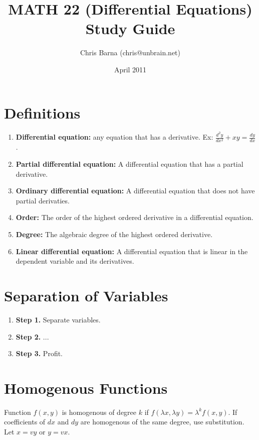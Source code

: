 \documentclass{article}
\begin{document}
\title{MATH 22 (Differential Equations) Study Guide}
\author{Chris Barna (chris@unbrain.net)}
\date{April 2011}

\maketitle

\section{Definitions}
\begin{enumerate}
  \item \textbf{Differential equation:} any equation that has a derivative. Ex: $\frac{d^2 y}{dx^2} + xy = \frac{dy}{dx}$.
  \item \textbf{Partial differential equation:} A differential equation that has a partial derivative.
  \item \textbf{Ordinary differential equation:} A differential equation that does not have partial derivaties.
  \item \textbf{Order:} The order of the highest ordered derivative in a differential equation.
  \item \textbf{Degree:} The algebraic degree of the highest ordered derivative.
  \item \textbf{Linear differential equation:} A differential equation that is linear in the dependent variable and its derivatives.
\end{enumerate}

\section{Separation of Variables}
\begin{enumerate}
  \item \textbf{Step 1.} Separate variables.
  \item \textbf{Step 2.} ...
  \item \textbf{Step 3.} Profit.
\end{enumerate}

\section{Homogenous Functions}
Function $f(x,y)$ is homogenous of degree $k$ if $f(\lambda x, \lambda y) = \lambda^k f(x,y)$. If coefficients of $dx$ and $dy$ are homogenous of the same degree, use substitution. Let $x=vy$ or $y=vx$.
\end{document}
